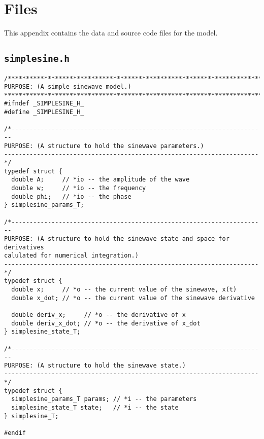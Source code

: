 \chapter{\simplesine Files}\label{sec:simplesine-files}

This appendix contains the data and source code files for the
\simplesine model.

\section{\tt simplesine.h}\label{sec:simplesine-h}

\begin{lstlisting}[caption={\tt simplesine.h},label={list:simplesine-h}]
/***********************************************************************
PURPOSE: (A simple sinewave model.)
***********************************************************************/
#ifndef _SIMPLESINE_H_
#define _SIMPLESINE_H_

/*----------------------------------------------------------------------
PURPOSE: (A structure to hold the sinewave parameters.)
----------------------------------------------------------------------*/
typedef struct {
  double A;     // *io -- the amplitude of the wave
  double w;     // *io -- the frequency
  double phi;   // *io -- the phase 
} simplesine_params_T;

/*----------------------------------------------------------------------
PURPOSE: (A structure to hold the sinewave state and space for derivatives
calulated for numerical integration.)
----------------------------------------------------------------------*/
typedef struct {
  double x;     // *o -- the current value of the sinewave, x(t)
  double x_dot; // *o -- the current value of the sinewave derivative

  double deriv_x;     // *o -- the derivative of x
  double deriv_x_dot; // *o -- the derivative of x_dot
} simplesine_state_T;

/*----------------------------------------------------------------------
PURPOSE: (A structure to hold the sinewave state.)
----------------------------------------------------------------------*/
typedef struct {
  simplesine_params_T params; // *i -- the parameters 
  simplesine_state_T state;   // *i -- the state
} simplesine_T;

#endif
\end{lstlisting}






